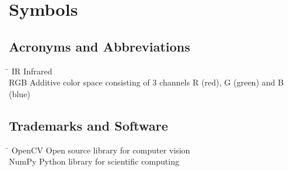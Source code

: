 \chapter*{Symbols}
\label{sec:symbols}




\section*{Acronyms and Abbreviations}
\begin{tabbing}
 \hspace*{2 cm}  \= \kill
 IR \> Infrared \\[0.5ex]
 RGB \> Additive color space consisting of 3 channels R (red), G (green) and B (blue) \\[0.5ex]
\end{tabbing}

\section*{Trademarks and Software}
\begin{tabbing}
 \hspace*{2 cm}  \= \kill
 OpenCV \> Open source library for computer vision\\[0.5ex]
 NumPy \> Python library for scientific computing\\[0.5ex]
\end{tabbing}